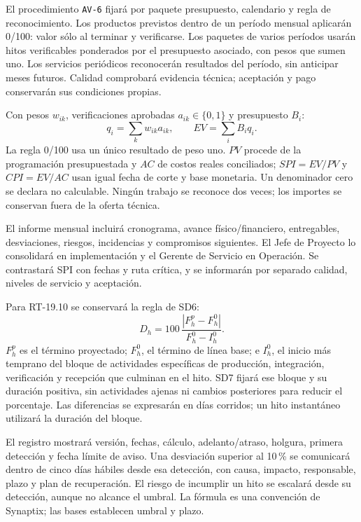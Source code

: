 El procedimiento \texttt{AV-6} fijará por paquete presupuesto, calendario y regla de reconocimiento. Los productos previstos dentro de un período mensual aplicarán 0/100: valor sólo al terminar y verificarse. Los paquetes de varios períodos usarán hitos verificables ponderados por el presupuesto asociado, con pesos que sumen uno. Los servicios periódicos reconocerán resultados del período, sin anticipar meses futuros. Calidad comprobará evidencia técnica; aceptación y pago conservarán sus condiciones propias.

Con pesos $w_{ik}$, verificaciones aprobadas $a_{ik}\in\{0,1\}$ y presupuesto $B_i$:
\[
q_i=\sum_k w_{ik}a_{ik},
\qquad
EV=\sum_i B_iq_i.
\]
La regla 0/100 usa un único resultado de peso uno. $PV$ procede de la programación presupuestada y $AC$ de costos reales conciliados; $SPI=EV/PV$ y $CPI=EV/AC$ usan igual fecha de corte y base monetaria. Un denominador cero se declara no calculable. Ningún trabajo se reconoce dos veces; los importes se conservan fuera de la oferta técnica. \parencites[p.~1]{sd6-nasa}[RT-19.06/07, p.~34]{sd6-bt}[art.~50.2, p.~29]{sd6-ba}

El informe mensual incluirá cronograma, avance físico/financiero, entregables, desviaciones, riesgos, incidencias y compromisos siguientes. El Jefe de Proyecto lo consolidará en implementación y el Gerente de Servicio en Operación. Se contrastará SPI con fechas y ruta crítica, y se informarán por separado calidad, niveles de servicio y aceptación.

Para RT-19.10 se conservará la regla de SD6:
\[
D_h=100\,\frac{|F_h^p-F_h^0|}{F_h^0-I_h^0}.
\]
$F_h^p$ es el término proyectado; $F_h^0$, el término de línea base; e $I_h^0$, el inicio más temprano del bloque de actividades específicas de producción, integración, verificación y recepción que culminan en el hito. SD7 fijará ese bloque y su duración positiva, sin actividades ajenas ni cambios posteriores para reducir el porcentaje. Las diferencias se expresarán en días corridos; un hito instantáneo utilizará la duración del bloque.

El registro mostrará versión, fechas, cálculo, adelanto/atraso, holgura, primera detección y fecha límite de aviso. Una desviación superior al 10\,\% se comunicará dentro de cinco días hábiles desde esa detección, con causa, impacto, responsable, plazo y plan de recuperación. El riesgo de incumplir un hito se escalará desde su detección, aunque no alcance el umbral. La fórmula es una convención de Synaptix; las bases establecen umbral y plazo. \parencite[RT-19.10, p.~34]{sd6-bt}

